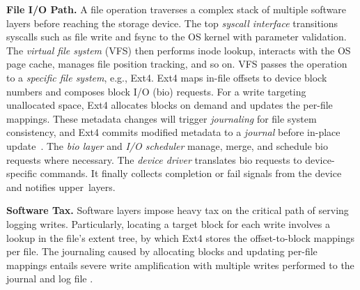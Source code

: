 \textbf{File I/O Path.}
A file operation %
traverses a complex  stack   of multiple software layers 
before reaching the storage device. %
The top    {\em syscall interface} %
  transitions syscalls such as file write and fsync to the OS kernel  with parameter validation.
The {\em virtual file system} ({VFS}) then performs inode lookup, interacts with the OS page cache, 
manages file position tracking, and so on.%
VFS passes the  operation to
a {\em specific file system}, e.g., %
Ext4. %
Ext4
maps   in-file offsets to device block numbers and   composes block I/O (bio) requests.
For a write targeting unallocated space, Ext4 allocates   blocks on demand
and updates the per-file mappings. These metadata changes will trigger
{\em journaling} for file system consistency, and Ext4 commits modified metadata
to a  {\em journal}
before in-place update~\cite{fsync:FastCommit:ATC-2024,fsync:iJournaling:ATC-2017}.
The {\em bio layer} and {\em I/O scheduler}  manage, merge, and schedule bio requests where necessary. 
The {\em device driver} translates bio requests to device-specific commands. It finally collects completion or fail signals from the device and
notifies upper~layers.



\textbf{Software Tax.}	
Software layers impose heavy tax on the critical path of serving  logging writes.
Particularly, locating a target block for each write involves a lookup
in the file's extent tree, by which Ext4 stores the offset-to-block mappings per file. 
The journaling caused by allocating blocks and updating  per-file mappings 
entails severe write amplification with multiple writes performed to  the journal and log file \cite{fsync:iJournaling:ATC-2017,fsync:FastCommit:ATC-2024}.



